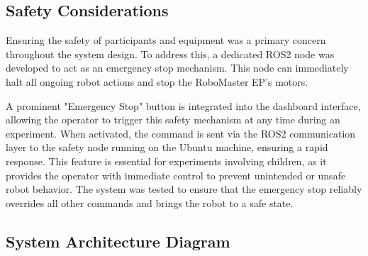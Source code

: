 \documentclass[a4paper]{usiinfbachelorproject}
\begin{document}
\subsection{\textbf{Safety Considerations}}
Ensuring the safety of participants and equipment was a primary concern throughout the system design.
To address this, a dedicated ROS2 node was developed to act as an emergency stop mechanism.
This node can immediately halt all ongoing robot actions and stop the RoboMaster EP's motors.

A prominent "Emergency Stop" button is integrated into the dashboard interface, allowing the operator to trigger this safety mechanism at any time during an experiment.
When activated, the command is sent via the ROS2 communication layer to the safety node running on the Ubuntu machine, ensuring a rapid response.
This feature is essential for experiments involving children, as it provides the operator with immediate control to prevent unintended or unsafe robot behavior.
The system was tested to ensure that the emergency stop reliably overrides all other commands and brings the robot to a safe state.

\subsection{\textbf{System Architecture Diagram}}
\end{document}
